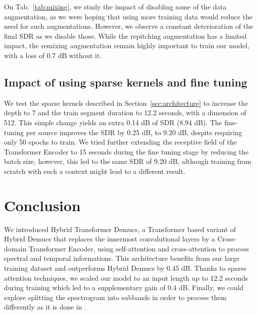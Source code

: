 \documentclass{article}
\begin{document}
On Tab.~\ref{tab:mixing}, we study the impact of disabling some of the data augmentation, 
as we were hoping that using more training data would reduce the need for such augmentations. However,
we observe a constant deterioration of the final SDR as we disable those.
While the repitching augmentation has a limited impact, the remixing augmentation
remain highly important to train our model, with a loss of 0.7 dB without it.

\subsection{Impact of using sparse kernels and fine tuning}
\label{sec:finetune}

We test the sparse kernels described in Section~\ref{sec:architecture} to increase the depth to 7 and
the train segment duration to 12.2 seconds, with a dimension of 512. This simple change yields an extra 0.14 dB of SDR (8.94 dB). The fine-tuning per source improves the SDR by 0.25 dB, to 9.20 dB, despite requiring only 50 epochs to train. We tried further extending the receptive field
of the Transformer Encoder to 15 seconds during the fine tuning stage by reducing the batch size, 
however, this led to the same SDR of 9.20 dB, although training
from scratch with such a context might lead to a different result.

\section*{Conclusion}

We introduced Hybrid Transformer Demucs, a Transformer based variant of Hybrid Demucs that replaces the innermost convolutional layers by a Cross-domain Transformer Encoder, using self-attention and cross-attention to process spectral and temporal informations. This architecture benefits from our large training dataset and outperforms Hybrid Demucs by 0.45 dB. Thanks to sparse attention techniques, we scaled our model to an input length up to 12.2 seconds during training which led to a supplementary gain of 0.4 dB. 
 Finally, we could explore splitting the spectrogram into subbands in order to process them differently as it is done in \cite{bsrnn}. 
\end{document}
